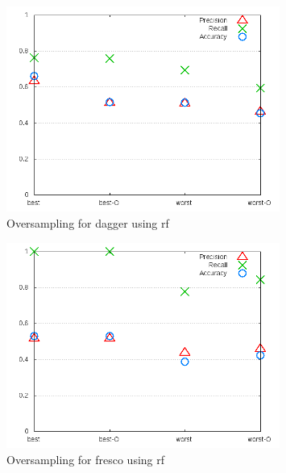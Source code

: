 \begin{figure}[!h]
    \centering
        \includegraphics[width=0.8\textwidth]{images/rf/test_4/dagger_sample_range}
        \caption{Oversampling for dagger using \gls{rf}}
        \label{fig:test_4_dagger_rf}
\end{figure}



\begin{figure}[!h]
    \centering
        \includegraphics[width=0.8\textwidth]{images/rf/test_4/fresco_sample_range}
        \caption{Oversampling for fresco using \gls{rf}}
        \label{fig:test_4_fresco_rf}
\end{figure}

